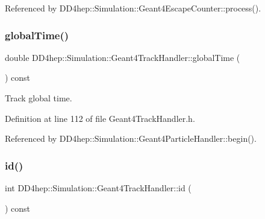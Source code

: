 Referenced by D\+D4hep\+::\+Simulation\+::\+Geant4\+Escape\+Counter\+::process().

\hypertarget{class_d_d4hep_1_1_simulation_1_1_geant4_track_handler_a6baa2a4bff1728d1de2d83da6e06cbdd}{}\label{class_d_d4hep_1_1_simulation_1_1_geant4_track_handler_a6baa2a4bff1728d1de2d83da6e06cbdd} 
\subsubsection{\texorpdfstring{global\+Time()}{globalTime()}}
{\footnotesize\ttfamily double D\+D4hep\+::\+Simulation\+::\+Geant4\+Track\+Handler\+::global\+Time (\begin{DoxyParamCaption}{ }\end{DoxyParamCaption}) const\hspace{0.3cm}{\ttfamily [inline]}}



Track global time. 



Definition at line 112 of file Geant4\+Track\+Handler.\+h.



Referenced by D\+D4hep\+::\+Simulation\+::\+Geant4\+Particle\+Handler\+::begin().

\hypertarget{class_d_d4hep_1_1_simulation_1_1_geant4_track_handler_ab7681e7aa6c392a8cdbd41d9d3e7c7b9}{}\label{class_d_d4hep_1_1_simulation_1_1_geant4_track_handler_ab7681e7aa6c392a8cdbd41d9d3e7c7b9} 
\subsubsection{\texorpdfstring{id()}{id()}}
{\footnotesize\ttfamily int D\+D4hep\+::\+Simulation\+::\+Geant4\+Track\+Handler\+::id (\begin{DoxyParamCaption}{ }\end{DoxyParamCaption}) const\hspace{0.3cm}{\ttfamily [inline]}}




